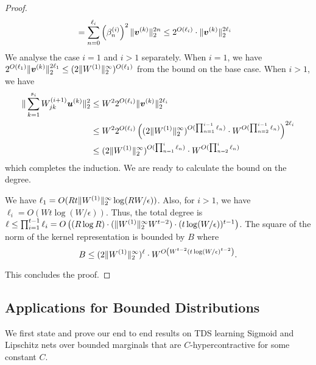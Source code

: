 \begin{proof}
\begin{align*}
&=\sum_{n=0}^{\ell_i}\left(\beta^{(i)}_n\right)^2\|{\bm{v}}^{(k)}\|_{2}^{2n}\leq 2^{O(\ell_i)}\cdot \|{\bm{v}}^{(k)}\|_{2}^{2\ell_{i}}
\end{align*}
We analyse the case $i=1$ and $i>1$ separately. When $i=1$, we have $2^{O(\ell_1)}\|{\bm{v}}^{(k)}\|_{2}^{2\ell_1}\leq (2\|W^{(1)}\|_{2}^{\infty})^{O(\ell_1)}$ from the bound on the base case. When $i>1$, we have 
\begin{align*}
     \|\sum_{k=1}^{s_i}W^{(i+1)}_{jk}{\bm{u}}^{(k)}\|_{2}^2&\leq W^2 2^{O(\ell_i)}\|{\bm{v}}^{(k)}\|_{2}^{2\ell_i}\\
     &\leq W^2 2^{O(\ell_i)}\left((2\|W^{(1)}\|_{2}^{\infty})^{O(\prod_{n=1}^{i-1}\ell_{n})}\cdot W^{O(\prod_{n=2}^{i-1}\ell_n)}\right)^{2\ell_i}\\
     &\leq (2\|W^{(1)}\|_{2}^{\infty})^{O(\prod_{n=1}^{i}\ell_{n})}\cdot W^{O(\prod_{n=2}^{i}\ell_n)}
\end{align*} which completes the induction. We are ready to calculate the bound on the degree. 

We have $\ell_1=O(Rt\|W^{(1)}\|_{2}^{\infty}\log(RW/\epsilon))$. Also, for $i>1$, we have $\ell_{i}=O(Wt\log(W/\epsilon))$. Thus, the total degree is 
$\ell\leq\prod_{i=1}^{t-1}\ell_i=O\left((R\log R)\cdot (\|W^{(1)}\|_{2}^{\infty}W^{t-2})\cdot (t\log(W/\epsilon))^{t-1}\right)$. The square of the norm of the kernel representation is bounded by $B$ where
\[
B\leq (2\|W^{(1)}\|_{2}^{\infty})^{\ell}\cdot W^{O\left(W^{t-2}(t\log(W/\epsilon)^{t-2}\right)}.
\]

This concludes the proof.
\end{proof}

\subsection{Applications for Bounded Distributions}
We first state and prove our end to end results on TDS learning Sigmoid and Lipschitz nets over bounded marginals that are $C$-hypercontractive for some constant $C$. 

